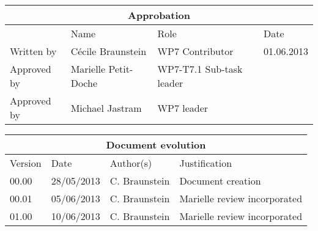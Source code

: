 \documentclass{openetcs_report}
\begin{document}
\begin{tabular}{|p{2.2cm}|p{4cm}|p{4cm}|p{2cm}|}
\hline
\multicolumn{4}{|c|}{Approbation} \\
\hline
  &  Name & Role & Date   \\
\hline  
Written by    &  C\'ecile Braunstein & WP7 Contributor  & 01.06.2013 \\
\hline
Approved by & Marielle Petit-Doche & WP7-T7.1 Sub-task  leader & \\
\hline
Approved by & Michael Jastram & WP7 leader & \\
\hline
\end{tabular}

\begin{tabular}{|p{2.2cm}|p{2cm}|p{3cm}|p{5cm}|}
\hline
\multicolumn{4}{|c|}{Document evolution} \\
\hline
Version &  Date & Author(s) & Justification  \\
\hline  
00.00 & 28/05/2013 & C. Braunstein &  Document creation  \\
00.01 & 05/06/2013 & C. Braunstein &  Marielle review incorporated  \\
01.00 & 10/06/2013 & C. Braunstein &  Marielle review incorporated  \\
\hline  

\end{tabular}



\newcommand{\tbd}{\colorbox{cyan}{\%\%To Be Defined\%\%}}
\newcommand{\tbc}{\colorbox{cyan}{\%\%To Be Confirmed\%\%}}
\newcommand{\todo}[1]{\colorbox{cyan}{\%\%{#1}\%\%}}
\newlength{\origindent}

\newenvironment{issue}{
        \begin{quote}
        \begin{itshape}Open Issue.
}{
        \end{itshape}
        \end{quote}
}

\newenvironment{comment}{
        \begin{quote}
        \begin{itshape}Comment.
}{
        \end{itshape}
        \end{quote}
}
\end{document}
